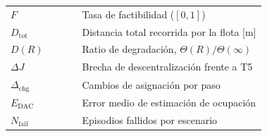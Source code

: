 \begin{longtable}{@{}l@{\hskip 2em}>{\raggedright\arraybackslash}p{0.72\linewidth}@{}}
$F$                         & Tasa de factibilidad ($[0,1]$) \\
$D_{\mathrm{tot}}$          & Distancia total recorrida por la flota [m] \\
$D(R)$                      & Ratio de degradación, $\Theta(R)/\Theta(\infty)$ \\
$\Delta J$                  & Brecha de descentralización frente a T5 \\
$\Delta_{\mathrm{chg}}$     & Cambios de asignación por paso \\
$E_{\mathrm{DAC}}$          & Error medio de estimación de ocupación \\
$N_{\mathrm{fail}}$         & Episodios fallidos por escenario \\
\bottomrule
\end{longtable}
\endgroup
\setcounter{table}{0}
